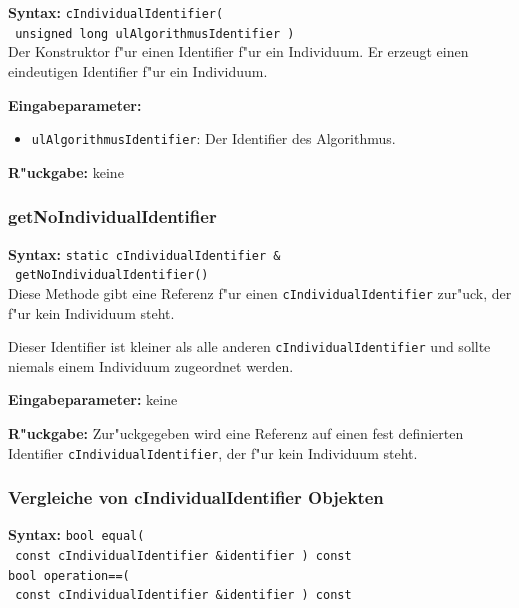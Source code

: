 \textbf{Syntax:} \verb|cIndividualIdentifier(| \\\verb| unsigned long ulAlgorithmusIdentifier )| \\

Der Konstruktor f"ur einen Identifier f"ur ein Individuum. Er erzeugt einen eindeutigen Identifier f"ur ein Individuum.

\bigskip\noindent
\textbf{Eingabeparameter:}
\begin{itemize}
 \item \verb|ulAlgorithmusIdentifier|: Der Identifier des Algorithmus.
\end{itemize}

\bigskip\noindent
\textbf{R"uckgabe:} keine


\subsubsection{getNoIndividualIdentifier}

\textbf{Syntax:} \verb|static cIndividualIdentifier &| \\\verb| getNoIndividualIdentifier()| \\

Diese Methode gibt eine Referenz f"ur einen \verb|cIndividualIdentifier| zur"uck, der f"ur kein Individuum steht.

Dieser Identifier ist kleiner als alle anderen \verb|cIndividualIdentifier| und sollte niemals einem Individuum zugeordnet werden.

\bigskip\noindent
\textbf{Eingabeparameter:} keine

\bigskip\noindent
\textbf{R"uckgabe:} Zur"uckgegeben wird eine Referenz auf einen fest definierten Identifier \verb|cIndividualIdentifier|, der f"ur kein Individuum steht.


\subsubsection{Vergleiche von cIndividualIdentifier Objekten}

\textbf{Syntax:} \verb|bool equal(| \\\verb| const cIndividualIdentifier &identifier ) const|\\
\verb|bool operation==(| \\\verb| const cIndividualIdentifier &identifier ) const|

